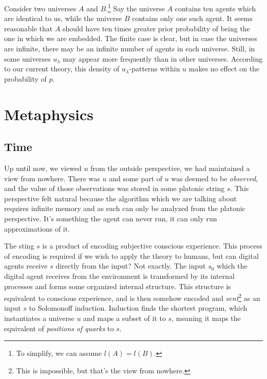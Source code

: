 Consider two universes $A$ and $B$.\footnote{To simplify, we can assume $l(A) = l(B)$.}
Say the universe $A$ contains ten agents which are identical to us, while the universe $B$ contains only one such agent.
It seems reasonable that $A$ should have ten times greater prior probability of being the one in which we are embedded.
The finite case is clear, but in case the universes are infinite, there may be an infinite number of agents in each universe.
Still, in some universes $u_\lambda$ may appear more frequently than in other universes.
According to our current theory, this density of $u_\lambda$-patterns within $u$ makes no effect on the probability of $p$.

\newpage

\section{Metaphysics}

\subsection{Time}

Up until now, we viewed $u$ from the outside perspective, we had maintained a view from nowhere.
There was $u$ and some part of $u$ was deemed to be \textit{observed}, and the value of those observations was stored in some platonic string $s$.
This perspective felt natural because the algorithm which we are talking about requires infinite memory and as such can only be analyzed from the platonic perspective.
It's something the agent can never run, it can only run approximations of it.

The sting $s$ is a product of encoding subjective conscious experience.
This process of encoding is required if we wish to apply the theory to humans, but can digital agents receive $s$ directly from the input?
Not exactly.
The input $s_0$ which the digital agent receives from the environment is transformed by its internal processes and forms some organized internal structure.
This structure is equivalent to conscious experience, and is then somehow encoded and \textit{sent}\footnote{This is impossible, but that's the view from nowhere.} as an input $s$ to Solomonoff induction.
Induction finds the shortest program, which instantiates a universe $u$ and maps a subset of it to $s$, meaning it maps the equivalent of \textit{positions of quarks} to $s$.

